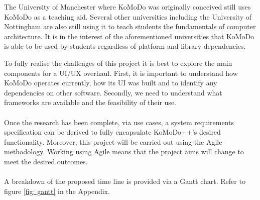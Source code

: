 The University of Manchester where KoMoDo was originally conceived still uses KoMoDo as a teaching aid. Several other universities including the University of Nottingham are also still using it to teach students the fundamentals of computer architecture. It is in the interest of the aforementioned universities that KoMoDo is able to be used by students regardless of platform and library dependencies.

To fully realise the challenges of this project it is best to explore the main components for a UI/UX overhaul. First, it is important to understand how KoMoDo operates currently, how its UI was built and to identify any dependencies on other software. Secondly, we need to understand what frameworks are available and the feasibility of their use. \\\\
%
Once the research has been complete, via use cases, a system requirements specification can be derived to fully encapsulate KoMoDo++'s desired functionality. Moreover, this project will be carried out using the Agile methodology. Working using Agile means that the project aims will change to meet the desired outcomes.\\\\
%
A breakdown of the proposed time line is provided via a Gantt chart. Refer to figure \ref{fig: gantt} in the Appendix.
